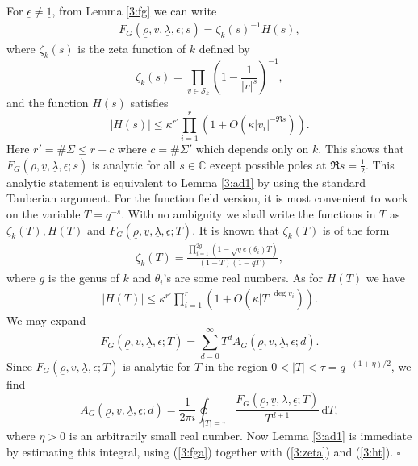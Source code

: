 \documentclass[12pt]{amsart}
\theoremstyle{plain}
\begin{document}
 For ${\underline{{\epsilon}}} \ne {\underline{{1}}}$,  from Lemma \ref{3:fg} we can write
\begin{eqnarray} \label{3:fga} F_G({\underline{{\rho}}},{\underline{{v}}},{\underline{{\lambda}}},{\underline{{\epsilon}}};s)=\zeta_k(s)^{-1}H(s), \end{eqnarray}
where $\zeta_k(s)$ is the zeta function of $k$ defined by
\[\zeta_k(s)=\prod_{v \in {\mathcal{S}_k}}\left(1-\frac{1}{|v|^s}\right)^{-1},\]
and the function $H(s)$ satisfies
\[|H(s)| \le \kappa^{r'} \prod_{i=1}^r \left(1+O(\kappa |v_i|^{-\Re s})\right). \]
Here $r'=\#\Sigma \le r+c$ where $c=\#\Sigma'$ which depends only on $k$. This shows that $F_G({\underline{{\rho}}},{\underline{{v}}},{\underline{{\lambda}}},{\underline{{\epsilon}}};s)$ is analytic for all $s \in {{\mathbb C}}$ except possible poles at $\Re s=\frac{1}{2}$. This analytic statement is equivalent to Lemma \ref{3:ad1} by using the standard Tauberian argument. For the function field version, it is most convenient to work on the variable $T=q^{-s}$. With no ambiguity we shall write the functions in $T$ as $\zeta_k(T), H(T)$ and $F_G({\underline{{\rho}}},{\underline{{v}}},{\underline{{\lambda}}},{\underline{{\epsilon}}};T)$. It is known that $\zeta_k(T)$ is of the form
\begin{eqnarray} \label{3:zeta} \zeta_k(T)=\frac{\prod_{i=1}^{2g}\left(1-\sqrt{q} e(\theta_i) T\right)}{(1-T)(1-qT)}, \end{eqnarray}
where $g$ is the genus of $k$ and $\theta_i$'s are some real numbers. As for $H(T)$ we have
\begin{eqnarray} \label{3:ht} |H(T)| \le \kappa^{r'} \prod_{i=1}^r \left(1+O(\kappa |T|^{\deg v_i})\right). \end{eqnarray}
We may expand
\[F_G({\underline{{\rho}}},{\underline{{v}}},{\underline{{\lambda}}},{\underline{{\epsilon}}};T)=
\sum_{d=0}^{\infty}T^d {A_{G}({\underline{{\rho}}},{\underline{{v}}},{\underline{{\lambda}}},{\underline{{\epsilon}}};d)}.\]
Since  $F_G({\underline{{\rho}}},{\underline{{v}}},{\underline{{\lambda}}},{\underline{{\epsilon}}};T)$ is analytic for $T$ in the region $0<|T|<\tau=q^{-(1+\eta)/2}$, we find
\[{A_{G}({\underline{{\rho}}},{\underline{{v}}},{\underline{{\lambda}}},{\underline{{\epsilon}}};d)}=\frac{1}{2 \pi i} \oint_{|T|=\tau} \frac{F_G({\underline{{\rho}}},{\underline{{v}}},{\underline{{\lambda}}},{\underline{{\epsilon}}};T)}{T^{d+1}} \, {\mathrm{d}}  T,\]
where $\eta>0$ is an arbitrarily small real number. Now Lemma \ref{3:ad1} is immediate by estimating this integral, using (\ref{3:fga}) together with (\ref{3:zeta}) and (\ref{3:ht}). \quad $\square$
\end{document}
